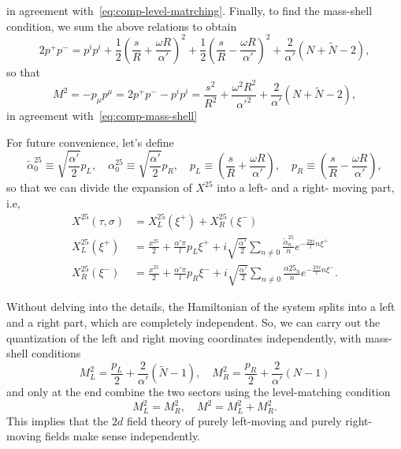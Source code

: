 \begin{mdframed}
\begin{innerproof}
\begin{equation*}
    \end{equation*}
    in agreement with~\eqref{eq:comp-level-matrching}. Finally, to find the mass-shell condition, we sum the above relations to obtain
    \begin{equation*}
        2p^+p^- = p^i p^i + \frac{1}{2} \left( \frac{s}{R} + \frac{\omega R}{\alpha'} \right)^2 + \frac{1}{2} \left( \frac{s}{R} - \frac{\omega R}{\alpha'} \right)^2 + \frac{2}{\alpha'} (N + \tilde{N} - 2),
    \end{equation*}
    so that
    \begin{equation}
        M^2 = -p_\mu p^\mu = 2 p^+ p^- - p^i p^i = \frac{s^2}{R^2} + \frac{\omega^2 R^2}{\alpha'^2} + \frac{2}{\alpha'} (N + \tilde{N} - 2),
    \end{equation}
    in agreement with~\eqref{eq:comp-mass-shell}
\end{innerproof}
\end{mdframed}

For future convenience, let's define
\begin{equation}
    \tilde{\alpha}^{25}_0 \equiv \sqrt{\frac{\alpha'}{2}} p_L, \quad {\alpha}^{25}_0 \equiv \sqrt{\frac{\alpha'}{2}} p_R, \quad p_L \equiv \left( \frac{s}{R} + \frac{\omega R}{\alpha'} \right), \quad p_R \equiv \left( \frac{s}{R} - \frac{\omega R}{\alpha'} \right) ,
\end{equation}
so that we can divide the expansion of $X^{25}$ into a left- and a right- moving part, i.e,
\begin{subequations}
\begin{align}
    X^{25}(\tau,\sigma) &= X^{25}_L(\xi^+) + X^{25}_R(\xi^-) \\
    X^{25}_L(\xi^+)     &= \frac{x^{25}}{2} + \frac{\alpha' \pi}{l} p_L \xi^+ + i \sqrt{\frac{\alpha'}{2}} \sum_{n\neq 0} \frac{\tilde{\alpha}^{25}_n}{n}e^{-\frac{2\pi i}{l}n \xi^+} \\
    X^{25}_R(\xi^-)     &= \frac{x^{25}}{2} + \frac{\alpha' \pi}{l} p_R \xi^- + i \sqrt{\frac{\alpha'}{2}} \sum_{n\neq 0} \frac{{\alpha}{25}_n}{n}e^{-\frac{2\pi i}{l}n \xi^-}.
\end{align}
\end{subequations}

Without delving into the details, the Hamiltonian of the system splits into a left and a right part, which are completely independent. So, we can carry out the quantization of the left and right moving coordinates independently, with mass-shell conditions
\begin{equation}
    M^2_L = \frac{p_L}{2} + \frac{2}{\alpha'}(\tilde{N}-1), \quad M^2_R = \frac{p_R}{2} + \frac{2}{\alpha'}({N}-1)
\end{equation}
and only at the end combine the two sectors using the level-matching condition
\begin{equation}
    M^2_L = M^2_R, \quad M^2 = M^2_L + M^2_R .
\end{equation}
This implies that the $2d$ field theory of purely left-moving and purely right-moving fields make sense independently.

